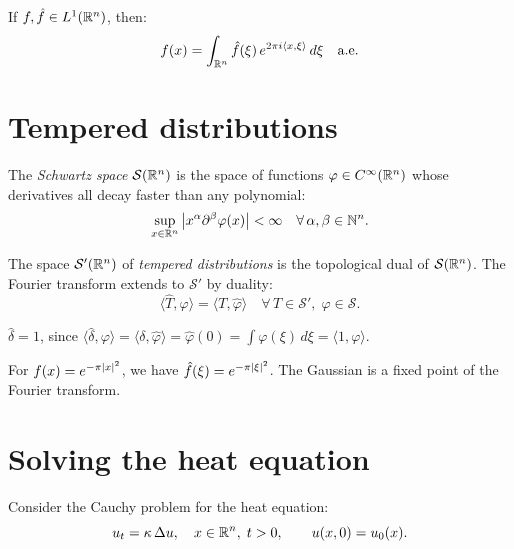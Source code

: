 \begin{theorem}
If $f, \hat{f} \in L^1(\mathbb{R}^n)$, then:
\[
    f(x) = \int_{\mathbb{R}^n} \hat{f}(\xi)\, e^{2\pi i \langle x, \xi \rangle} \, d\xi
    \quad \text{a.e.}
\]
\end{theorem}

\section{Tempered distributions}

\begin{definition}
The \emph{Schwartz space} $\mathcal{S}(\mathbb{R}^n)$ is the space of functions
$\varphi \in C^\infty(\mathbb{R}^n)$ whose derivatives all decay faster than any
polynomial:
\[
    \sup_{x \in \mathbb{R}^n} \left| x^\alpha \partial^\beta \varphi(x) \right| < \infty
    \quad \forall\, \alpha, \beta \in \mathbb{N}^n.
\]
\end{definition}

\begin{definition}
The space $\mathcal{S}'(\mathbb{R}^n)$ of \emph{tempered distributions} is the
topological dual of $\mathcal{S}(\mathbb{R}^n)$. The Fourier transform extends to
$\mathcal{S}'$ by duality:
\[
    \langle \hat{T}, \varphi \rangle = \langle T, \hat{\varphi} \rangle
    \quad \forall\, T \in \mathcal{S}', \; \varphi \in \mathcal{S}.
\]
\end{definition}

\begin{example}
$\hat{\delta} = 1$, since $\langle \hat{\delta}, \varphi \rangle = \langle \delta, \hat{\varphi} \rangle
= \hat{\varphi}(0) = \int \varphi(\xi)\, d\xi = \langle 1, \varphi \rangle$.
\end{example}

\begin{example}
For $f(x) = e^{-\pi \left| x \right|^2}$, we have $\hat{f}(\xi) = e^{-\pi \left| \xi \right|^2}$.
The Gaussian is a fixed point of the Fourier transform.
\end{example}

\section{Solving the heat equation}

Consider the Cauchy problem for the heat equation:
\begin{equation}\label{eq:heat_cauchy}
    u_t = \kappa\, \Delta u, \quad x \in \mathbb{R}^n,\; t > 0, \qquad
    u(x, 0) = u_0(x).
\end{equation}

